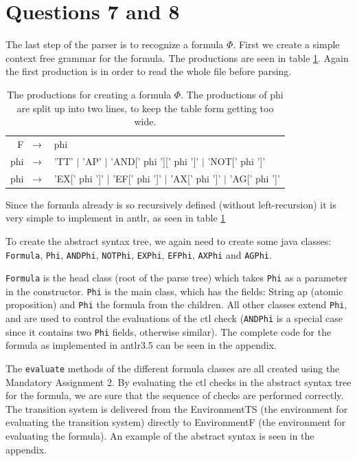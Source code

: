 \section*{Questions 7 and 8}

The last step of the parser is to recognize a formula $\Phi$. First we create a simple context free grammar for the formula. The productions are seen in table \ref{tab:Q7prod}. Again the first production is in order to read the whole file before parsing.

\begin{table}[H]
    \centering
    \begin{tabular}{|rl|}
        \hline
        F $\; \rightarrow$ &  phi \\
        phi $\; \rightarrow$ & 'TT' $|$ 'AP' $|$ 'AND[' phi '][' phi ']' $|$ 'NOT[' phi ']' \\
        phi $\; \rightarrow$ & 'EX[' phi ']' $|$ 'EF[' phi ']' $|$ 'AX[' phi ']' $|$ 'AG[' phi ']'\\
        \hline
    \end{tabular}
    \caption{The productions for creating a formula $\Phi$. The productions of phi are split up into two lines, to keep the table form getting too wide.}
    \label{tab:Q7prod}
\end{table}

Since the formula already is so recursively defined (without left-recursion) it is very simple to implement in antlr, as seen in table \ref{tab:Q7prod}

To create the abstract syntax tree, we again need to create some java classes: \texttt{Formula}, \texttt{Phi}, \texttt{ANDPhi}, \texttt{NOTPhi}, \texttt{EXPhi}, \texttt{EFPhi}, \texttt{AXPhi} and \texttt{AGPhi}. 

\texttt{Formula} is the head class (root of the parse tree) which takes \texttt{Phi} as a parameter in the constructor. \texttt{Phi} is the main class, which has the fields: String ap (atomic proposition) and \texttt{Phi} the formula from the children. All other classes extend \texttt{Phi}, and are used to control the evaluations of the ctl check (\texttt{ANDPhi} is a special case since it contains two \texttt{Phi} fields, otherwise similar). The complete code for the formula as implemented in antlr3.5 can be seen in the appendix.

The \texttt{evaluate} methods of the different formula classes are all created using the Mandatory Assignment 2. By evaluating the ctl checks in the abstract syntax tree for the formula, we are sure that the sequence of checks are performed correctly. The transition system is delivered from the EnvironmentTS (the environment for evaluating the transition system) directly to EnvironmentF (the environment for evaluating the formula). An example of the abstract syntax is seen in the appendix.


